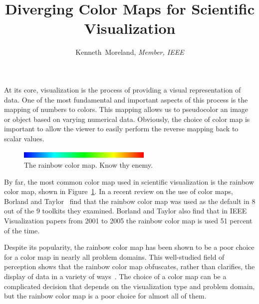 \documentclass[review,journal]{vgtc}         %
\title{Diverging Color Maps for Scientific Visualization}
\author{Kenneth~Moreland, \textit{Member, IEEE}}
\newcommand{\lcite}[1]{~\cite{#1}}
\newcommand{\scite}[1]{~\cite{#1}}
\begin{document}

\label{sec:Introduction}

\maketitle

At its core, visualization is the process of providing a visual
representation of data.  One of the most fundamental and important aspects
of this process is the mapping of numbers to colors.  This mapping allows
us to pseudocolor an image or object based on varying numerical data.
Obviously, the choice of color map is important to allow the viewer to
easily perform the reverse mapping back to scalar values.

\begin{figure}
  \centering
  \includegraphics[width=2.5in]{images/RainbowBar}
  \caption{The rainbow color map.  Know thy enemy.}
  \label{fig:RainbowColorMap}
\end{figure}

By far, the most common color map used in scientific visualization is the
rainbow color map, shown in Figure~\ref{fig:RainbowColorMap}.  In a recent
review on the use of color maps, Borland and Taylor\scite{Borland07} find
that the rainbow color map was used as the default in 8 out of the 9
toolkits they examined.  Borland and Taylor also find that in IEEE
Visualization papers from 2001 to 2005 the rainbow color map is used 51
percent of the time.

Despite its popularity, the rainbow color map has been shown to be a poor
choice for a color map in nearly all problem domains.  This well-studied
field of perception shows that the rainbow color map obfuscates, rather
than clarifies, the display of data in a variety of ways\lcite{Borland07}.
The choice of a color map can be a complicated decision that depends on the
visualization type and problem domain, but the rainbow color map is a poor
choice for almost all of them.
\end{document}
